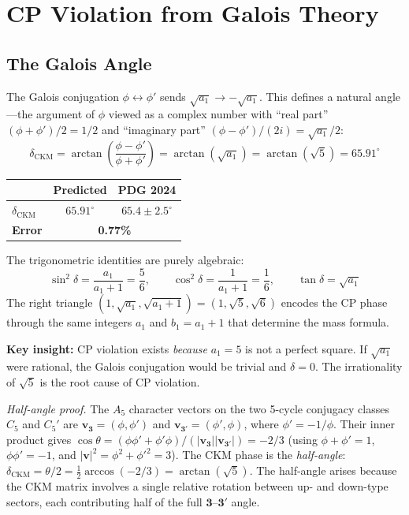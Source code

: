 \documentclass[12pt,a4paper]{article}
\theoremstyle{definition}
\begin{document}
\section{CP Violation from Galois Theory}
\label{sec:cp}

\subsection{The Galois Angle}

The Galois conjugation $\phi \leftrightarrow \phi'$ sends $\sqrt{a_1} \to -\sqrt{a_1}$. This defines a natural angle---the argument of $\phi$ viewed as a complex number with ``real part'' $(\phi + \phi')/2 = 1/2$ and ``imaginary part'' $(\phi - \phi')/(2i) = \sqrt{a_1}/2$:
\begin{equation}
\boxed{\delta_{\text{CKM}} = \arctan\!\left(\frac{\phi - \phi'}{\phi + \phi'}\right) = \arctan(\sqrt{a_1}) = \arctan(\sqrt{5}) = 65.91^\circ}
\label{eq:cp_ckm}
\end{equation}

\begin{center}
\begin{tabular}{lcc}
\toprule
& \textbf{Predicted} & \textbf{PDG 2024} \\
\midrule
$\delta_{\text{CKM}}$ & $65.91^\circ$ & $65.4 \pm 2.5^\circ$ \\
\textbf{Error} & \multicolumn{2}{c}{\textbf{0.77\%}} \\
\bottomrule
\end{tabular}
\end{center}

The trigonometric identities are purely algebraic:
\begin{equation}
\sin^2\delta = \frac{a_1}{a_1+1} = \frac{5}{6}, \qquad \cos^2\delta = \frac{1}{a_1+1} = \frac{1}{6}, \qquad \tan\delta = \sqrt{a_1}
\end{equation}
The right triangle $(1, \sqrt{a_1}, \sqrt{a_1+1}) = (1, \sqrt{5}, \sqrt{6})$ encodes the CP phase through the same integers $a_1$ and $b_1 = a_1 + 1$ that determine the mass formula.

\textbf{Key insight:} CP violation exists \emph{because} $a_1 = 5$ is not a perfect square. If $\sqrt{a_1}$ were rational, the Galois conjugation would be trivial and $\delta = 0$. The irrationality of $\sqrt{5}$ is the root cause of CP violation.

\textit{Half-angle proof.}  The $A_5$ character vectors on the two 5-cycle conjugacy classes $C_5$ and $C_5'$ are $\mathbf{v}_{\mathbf{3}} = (\phi, \phi')$ and $\mathbf{v}_{\mathbf{3'}} = (\phi', \phi)$, where $\phi' = -1/\phi$.  Their inner product gives $\cos\theta = (\phi\phi' + \phi'\phi)/(|\mathbf{v}_{\mathbf{3}}||\mathbf{v}_{\mathbf{3'}}|) = -2/3$ (using $\phi + \phi' = 1$, $\phi\phi' = -1$, and $|\mathbf{v}|^2 = \phi^2 + \phi'^2 = 3$).  The CKM phase is the \emph{half-angle}: $\delta_{\text{CKM}} = \theta/2 = \tfrac{1}{2}\arccos(-2/3) = \arctan(\sqrt{5})$.  The half-angle arises because the CKM matrix involves a single relative rotation between up- and down-type sectors, each contributing half of the full $\mathbf{3}$--$\mathbf{3'}$ angle.
\end{document}
